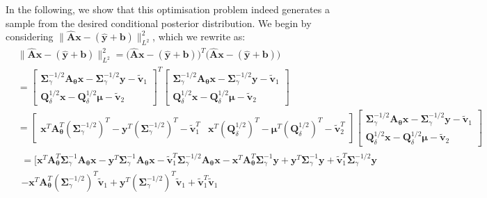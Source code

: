 \begin{mccorrection}
In the following, we show that this optimisation problem indeed generates a sample from the desired conditional posterior distribution. 
We begin by considering $\lVert \hat{\bm{A}} \bm{x} - ( \hat{\bm{y}} + \bm{b} ) \rVert_{L^2}^2$, which we rewrite as:
\begin{align*}
	&\lVert \hat{\bm{A}} \bm{x} - ( \hat{\bm{y}} + \bm{b} ) \rVert_{L^2}^2 = \big( \hat{\bm{A}} \bm{x} - ( \hat{\bm{y}} + \bm{b} ) \big)^T  \big(	 \hat{\bm{A}} \bm{x} - ( \hat{\bm{y}} + \bm{b} ) \big)  \\
	&= \begin{bmatrix}
		\bm{\Sigma}_{\gamma}^{-1/2} \bm{A}_{\bm{\theta}} \bm{x} - 	\bm{\Sigma}_{\gamma}^{-1/2} \bm{y} - \tilde{\bm{v}}_1  \\
		\bm{Q}_{\delta}^{1/2} \bm{x}-	\bm{Q}_{\delta}^{1/2} \bm{\mu}-\tilde{\bm{v}}_2
	\end{bmatrix}^T 	 \begin{bmatrix}
		\bm{\Sigma}_{\gamma}^{-1/2} \bm{A}_{\bm{\theta}} \bm{x} - 	\bm{\Sigma}_{\gamma}^{-1/2} \bm{y} -\tilde{\bm{v}}_1  \\
		\bm{Q}_{\delta}^{1/2} \bm{x}-	\bm{Q}_{\delta}^{1/2}  \bm{\mu} - \tilde{\bm{v}}_2
	\end{bmatrix}\\
	&= \begin{bmatrix}
		\bm{x}^T \bm{A}_{\bm{\theta}}^T (\bm{\Sigma}_{\gamma}^{-1/2})^T - 	 \bm{y}^T (\bm{\Sigma}_{\gamma}^{-1/2} )^T- \tilde{\bm{v}}_1^T &
		\bm{x}^T	(\bm{Q}_{\delta}^{1/2})^T -	\bm{\mu}^T (\bm{Q}_{\delta}^{1/2})^T -\tilde{\bm{v}}_2^T
	\end{bmatrix}	 \begin{bmatrix}
		\bm{\Sigma}_{\gamma}^{-1/2} \bm{A}_{\bm{\theta}} \bm{x} - 	\bm{\Sigma}_{\gamma}^{-1/2} \bm{y} -\tilde{\bm{v}}_1\\
		\bm{Q}_{\delta}^{1/2} \bm{x}-	\bm{Q}_{\delta}^{1/2} \bm{\mu}-\tilde{\bm{v}}_2
	\end{bmatrix}\\
	&\begin{aligned}
		= \big[ \bm{x}^T \bm{A}_{\bm{\theta}}^T \bm{\Sigma}^{-1}_{\gamma} \bm{A}_{\bm{\theta}} \bm{x}   - 	 \bm{y}^T \bm{\Sigma}^{-1}_{\gamma} \bm{A}_{\bm{\theta}} \bm{x}  -\tilde{\bm{v}}_1^T	\bm{\Sigma}_{\gamma}^{-1/2}  \bm{A}_{\bm{\theta}} \bm{x} 
		-\bm{x}^T \bm{A}_{\bm{\theta}}^T \bm{\Sigma}^{-1}_{\gamma}  \bm{y}  +	 \bm{y}^T \bm{\Sigma}^{-1}_{\gamma}  \bm{y} +\tilde{\bm{v}}_1^T	\bm{\Sigma}_{\gamma}^{-1/2}   \bm{y}\\
		-\bm{x}^T \bm{A}_{\bm{\theta}}^T (\bm{\Sigma}_{\gamma}^{-1/2})^T \tilde{\bm{v}}_1    + 	 \bm{y}^T (\bm{\Sigma}_{\gamma}^{-1/2})^T \tilde{\bm{v}}_1  +\tilde{\bm{v}}_1^T\tilde{\bm{v}}_1

\end{aligned}
\end{align*}
\end{mccorrection}
